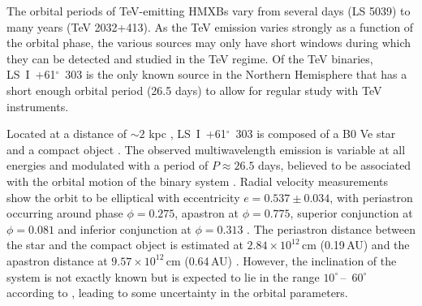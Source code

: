 \documentclass[preprint2]{aastex}
\newcommand{\lsi}{LS~I~+61$^{\circ}$~303}
\begin{document}
The orbital periods of TeV-emitting HMXBs vary from several days (LS 5039) to many years (TeV 2032+413). As the TeV emission varies strongly as a function of the orbital phase, the various sources may only have short windows during which they can be detected and studied in the TeV regime. Of the TeV binaries, \lsi{} is the only known source in the Northern Hemisphere that has a short enough orbital period (26.5 days) to allow for regular study with TeV instruments. 

Located at a distance of $\sim2$ kpc \citep{1991AJ....101.2126F}, \lsi{} is composed of a B0 Ve star and a compact object \citep{HandC1981, Casares2005}. The observed multiwavelength emission is variable at all energies and modulated with a period of $P \approx 26.5$ days, believed to be associated with the orbital motion of the binary system \citep{Albert2006, Esposito2007, VERITASLSIDetection, Abdo2009, LiXray, 2015A&A...575L...9M}. Radial velocity measurements show the orbit to be elliptical with eccentricity $e = 0.537\pm0.034$, with periastron occurring around phase $\phi=0.275$, apastron at $\phi=0.775$, superior conjunction at $\phi=0.081$ and inferior conjunction at $\phi=0.313$ \citep{Aragona2009}. The periastron distance between the star and the compact object is estimated at $2.84 \times 10^{12}$\,cm (0.19\,AU) and the apastron distance at $9.57 \times 10^{12}$\,cm (0.64\,AU) \citep{2013A&ARv..21...64D}. However, the inclination of the system is not exactly known but is expected to lie in the range $10^\circ$\,--~$60^\circ$ according to \citet{Casares2005}, leading to some uncertainty in the orbital parameters.

\end{document}
